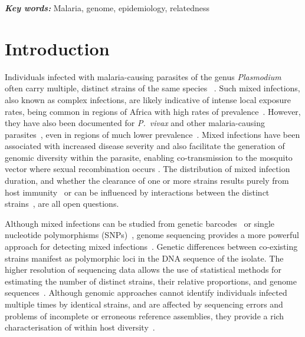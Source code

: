 \documentclass[9pt,lineno]{elife}
\providecommand{\keywords}[1]{\textbf{\textit{Key words:}} #1}
\begin{document}
\keywords{Malaria, genome, epidemiology, relatedness}


\section{Introduction}

Individuals infected with malaria-causing parasites of the genus {\it Plasmodium} often carry multiple, distinct strains of the same species ~\citep{Bell2006}.  Such mixed infections, also known as complex infections, are likely indicative of intense local exposure rates, being common in regions of Africa with high rates of prevalence~\citep{Howes2016}. However, they have also been documented for {\it P.~vivax} and other malaria-causing parasites~\citep{Mueller2007, Collins2012}, even in regions of much lower prevalence~\citep{Howes2016, Steenkeste2010}.  Mixed infections have been associated with increased disease severity \citep{deRoode2005} and also facilitate the generation of genomic diversity within the parasite, enabling co-transmission to the mosquito vector where sexual recombination occurs \citep{Mzilahowa2007}.  The distribution of mixed infection duration, and whether the clearance of one or more strains results purely from host immunity~\citep{Borrmann2011} or can be influenced by interactions between the distinct strains~\citep{Enosse2006, Bushman2016}, are all open questions.

Although mixed infections can be studied from genetic barcodes~\citep{Galinsky2015} or single nucleotide polymorphisms (SNPs)~\citep{Jack2016}, genome sequencing provides a more powerful approach for detecting mixed infections~\citep{Chang2017}.  Genetic differences between co-existing strains manifest as polymorphic loci in the DNA sequence of the isolate. The higher resolution of sequencing data allows the use of statistical methods for estimating the number of distinct strains, their relative proportions, and genome sequences~\citep{Zhu2017}.  Although genomic approaches cannot identify individuals infected multiple times by identical strains, and are affected by sequencing errors and problems of incomplete or erroneous reference assemblies, they provide a rich characterisation of within host diversity~\citep{Manske2012, auburn2012characterization, Pearson2016}.
\end{document}
